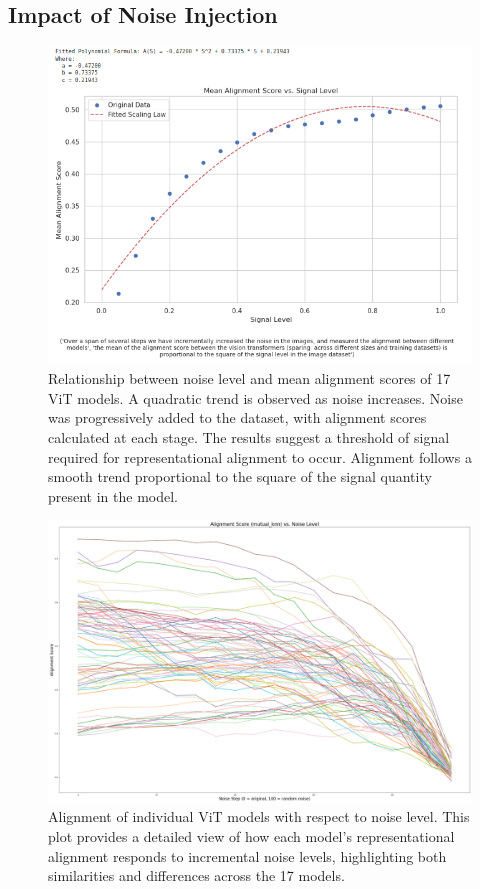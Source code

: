 \documentclass[10pt,a4paper]{article}
\begin{document}
\subsection{Impact of Noise Injection}
\begin{figure}[H]
    \centering
    \includegraphics[width=\textwidth]{alignment_vs_signal_level.png}
    \caption{Relationship between noise level and mean alignment scores of 17 ViT models. A quadratic trend is observed as noise increases. Noise was progressively added to the dataset, with alignment scores calculated at each stage. The results suggest a threshold of signal required for representational alignment to occur. Alignment follows a smooth trend proportional to the square of the signal quantity present in the model.}
    \label{fig:alignment_vs_signal_level}
\end{figure}

\clearpage

\begin{figure}[H]
    \centering
    \includegraphics[width=\textwidth]{alignment_plot.png}
    \caption{Alignment of individual ViT models with respect to noise level. This plot provides a detailed view of how each model’s representational alignment responds to incremental noise levels, highlighting both similarities and differences across the 17 models.}
    \label{fig:alignment_plot}
\end{figure}
\end{document}

